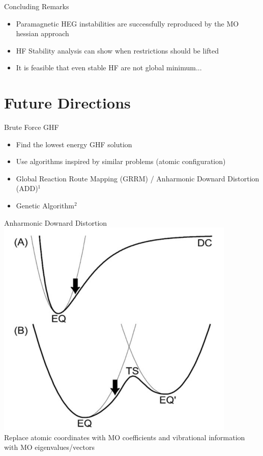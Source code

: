 \documentclass[10pt]{beamer}
\begin{document}
{{{{{{{{{{{{{\begin{frame}{Concluding Remarks}
  \begin{itemize}
    \item{ Paramagnetic HEG instabilities are successfully reproduced by the MO hessian approach }
    \item{ HF Stability analysis can show when restrictions should be lifted }
    \item{ It is feasible that even stable HF are not global minimum... }
  \end{itemize}
\end{frame}

\section{Future Directions}

\begin{frame}{Brute Force GHF}
	\begin{itemize}[<+->]
  	\item Find the lowest energy GHF solution 
  	\item Use algorithms inspired by similar problems (atomic configuration)
  	\item Global Reaction Route Mapping (GRRM) / Anharmonic Downard Distortion (ADD)$^1$
  	\item Genetic Algorithm$^2$
	\end{itemize}
\end{frame}

\begin{frame}{Anharmonic Downard Distortion}
  \centering
	\includegraphics[width=.6\linewidth]{../figures/ADD.png}\\
	Replace atomic coordinates with MO coefficients and vibrational information with MO 
	eigenvalues/vectors
\end{frame}

}}}}}}}}}}}}}
\end{document}
